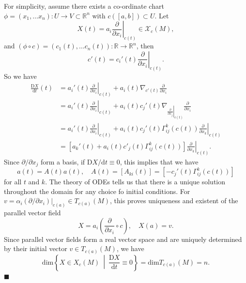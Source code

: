\documentclass[letter-paper]{tufte-book}
\newenvironment{proof}[1][Proof]{\begin{trivlist}
\item[\hskip \labelsep {\bfseries #1}]}{\end{trivlist}}
\newcommand{\qed}{\hfill$\blacksquare$}
\begin{document}
\begin{proof}
  For simplicity, assume there exists a co-ordinate chart $\phi = (x_1, \ldots x_n): U\to V \subset \mathbb{R}^n$ with $c([a,b]) \subset U$. Let
  \begin{equation*}
     X(t) = a_i \left.\frac{\partial}{\partial x_i}\right|_{c(t)} \in \mathcal{X}_c(M),
  \end{equation*}
  and $(\phi \circ c) = (c_1(t), \ldots c_n(t)): \mathbb{R} \to \mathbb{R}^n$, then
  \begin{equation*}
    c'(t) = c_i'(t)\left.\frac{\partial}{\partial x_i}\right|_{c(t)}.
  \end{equation*}
  So we have
  \begin{align*}
    \frac{\mathrm{D}X}{\mathrm{d}t}(t) 
      &= a_i'(t) \left.\frac{\partial}{\partial x_i}\right|_{c(t)} + a_i(t) \nabla_{c'(t)} \frac{\partial}{\partial x_i}\\
      &= a_i'(t) \left.\frac{\partial}{\partial x_i}\right|_{c(t)} + a_i(t) c_j'(t) \nabla_{\left.\frac{\partial}{\partial x_j}\right|_{c(t)}} \frac{\partial}{\partial x_i}\\
      &= a_i'(t) \left.\frac{\partial}{\partial x_i}\right|_{c(t)} + a_i(t) c_j'(t) \Gamma_{ij}^k(c(t)) \left.\frac{\partial}{\partial x_k}\right|_{c(t)}\\
      &= \left[a_k'(t) + a_i(t) c'_j(t) \Gamma_{ij}^k(c(t)) \right]\left.\frac{\partial}{\partial x_k}\right|_{c(t)}.
  \end{align*}
  Since $\partial / \partial x_j$ form a basis, if $\mathrm{D}X / \mathrm{d}t \equiv 0$, this implies that we have
  \begin{equation*}
    a(t) = A(t) a(t), \quad A(t) = [A_{ki}(t)] = \left[ -c_j'(t) \Gamma_{ij}^k(c(t))\right]
  \end{equation*}
  for all $t$ and $k$. The theory of ODEs tells us that there is a unique solution throughout the domain for any choice fo initial conditions. For $v = \alpha_i (\partial / \partial x_i)|_{c(a)} \in T_{c(a)}(M)$, this proves uniqueness and existent of the parallel vector field
  \begin{equation*}
    X = a_i \left(\frac{\partial}{\partial x_i} \circ c\right), \quad X(a) = v.
  \end{equation*}
  Since parallel vector fields form a real vector space and are uniquely determined by their initial vector $v \in T_{c(a)}(M)$, we have
  \begin{equation*}
    \mbox{dim}\left\{X \in X_c(M)\ \middle|\  \frac{\mathrm{D}X}{\mathrm{d}t} \equiv 0\right\} = \mbox{dim} T_{c(a)}(M) = n.
  \end{equation*}
  \qed
\end{proof}
\end{document}
